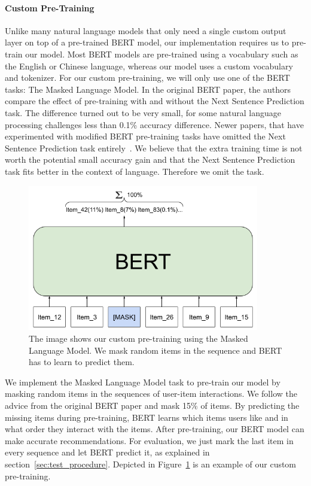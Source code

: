 \paragraph{Custom Pre-Training}
Unlike many natural language models that only need a single custom output layer on top of a pre-trained BERT model, our implementation requires us to pre-train our model. Most BERT models are pre-trained using a vocabulary such as the English or Chinese language, whereas our model uses a custom vocabulary and tokenizer. For our custom pre-training, we will only use one of the BERT tasks: The Masked Language Model. In the original BERT paper, the authors compare the effect of pre-training with and without the Next Sentence Prediction task. The difference turned out to be very small, for some natural language processing challenges less than 0.1\% accuracy difference. Newer papers, that have experimented with modified BERT pre-training tasks have omitted the Next Sentence Prediction task entirely~\cite{yang2019xlnet,liu2019roberta}. We believe that the extra training time is not worth the potential small accuracy gain and that the Next Sentence Prediction task fits better in the context of language. Therefore we omit the task. 

\begin{figure}[htbp]
\centering
\includegraphics[width=0.9\textwidth]{images/illustrations/bert_custom.png}
\caption{The image shows our custom pre-training using the Masked Language Model. We mask random items in the sequence and BERT has to learn to predict them.}
\label{fig:bert_custom}
\end{figure}

We implement the Masked Language Model task to pre-train our model by masking random items in the sequences of user-item interactions. We follow the advice from the original BERT paper and mask 15\% of items. By predicting the missing items during pre-training, BERT learns which items users like and in what order they interact with the items. After pre-training, our BERT model can make accurate recommendations. For evaluation, we just mark the last item in every sequence and let BERT predict it, as explained in section~\ref{sec:test_procedure}. Depicted in Figure~\ref{fig:bert_custom} is an example of our custom pre-training.

% 